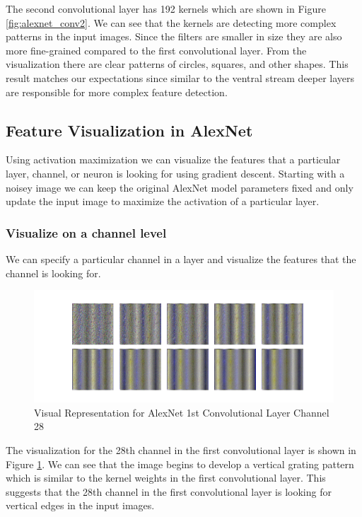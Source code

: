 \documentclass[12pt, letterpaper]{article}
\begin{document}
The second convolutional layer has 192 kernels which are shown in Figure \ref{fig:alexnet_conv2}. We can see that the kernels are detecting more complex patterns in the input images. Since the filters are smaller in size they are also more fine-grained compared to the first convolutional layer. From the visualization there are clear patterns of circles, squares, and other shapes. This result matches our expectations since similar to the ventral stream deeper layers are responsible for more complex feature detection.

\subsection{Feature Visualization in AlexNet}
Using activation maximization we can visualize the features that a particular layer, channel, or neuron is looking for using gradient descent. Starting with a noisey image we can keep the original AlexNet model parameters fixed and only update the input image to maximize the activation of a particular layer. 

\subsubsection{Visualize on a channel level}
We can specify a particular channel in a layer and visualize the features that the channel is looking for. 

\begin{figure}[H]
    \centering
    \includegraphics[width=1\textwidth]{alexnet_layer0_filter28.png}
    \caption{Visual Representation for AlexNet 1st Convolutional Layer Channel 28}
    \label{fig:alexnet_layer0_filter28}
\end{figure}

The visualization for the 28th channel in the first convolutional layer is shown in Figure \ref{fig:alexnet_layer0_filter28}. We can see that the image begins to develop a vertical grating pattern which is similar to the kernel weights in the first convolutional layer. This suggests that the 28th channel in the first convolutional layer is looking for vertical edges in the input images.
\end{document}
